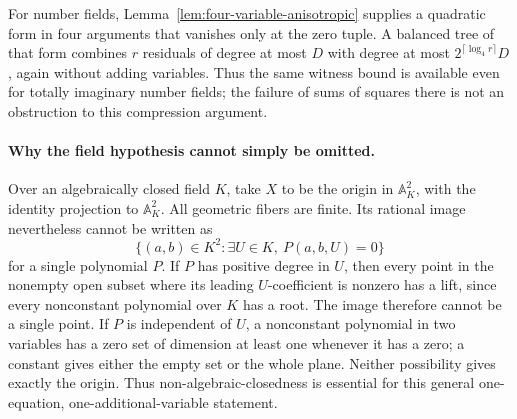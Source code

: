 For number fields, Lemma~\ref{lem:four-variable-anisotropic} supplies
a quadratic form in four arguments that vanishes only at the zero
tuple. A balanced tree of that form combines $r$ residuals of degree
at most $D$ with degree at most $2^{\lceil\log_4 r\rceil}D$, again
without adding variables. Thus the same witness bound is available
even for totally imaginary number fields; the failure of sums of
squares there is not an obstruction to this compression argument.

\paragraph{Why the field hypothesis cannot simply be omitted.}
Over an algebraically closed field $K$, take $X$ to be the origin in
$\mathbb A^2_K$, with the identity projection to $\mathbb A^2_K$.
All geometric fibers are finite. Its rational image nevertheless
cannot be written as
\[
 \{(a,b)\in K^2:\exists U\in K,\ P(a,b,U)=0\}
\]
for a single polynomial $P$. If $P$ has positive degree in $U$,
then every point in the nonempty open subset where its leading
$U$-coefficient is nonzero has a lift, since every nonconstant
polynomial over $K$ has a root. The image therefore cannot be a
single point. If $P$ is independent of $U$, a nonconstant polynomial
in two variables has a zero set of dimension at least one whenever
it has a zero; a constant gives either the empty set or the whole
plane. Neither possibility gives exactly the origin. Thus
non-algebraic-closedness is essential for this general one-equation,
one-additional-variable statement.
